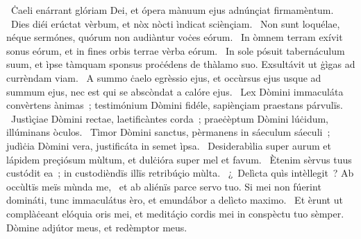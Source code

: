 \psalmChapterWithInscription{}
{ }
{%
~Ċaeli enárrant glóriam Dei, et ópera mànuum ejus adnúnçiat firmamèntum. 
~Dies diéi erúctat vèrbum, et nòx nòcti ìndicat sciènçiam. 
~Non sunt loquélae, néque sermónes, quórum non audiàntur voċes eórum. 
~In òmnem terram exívit sonus eórum, et in fines orbis terrae vèrba eórum. 
~In sole pósuit tabernáculum suum, et ìpse tàmquam sponsus proċédens de thàlamo suo. Exsultávit ut ġìgas ad currèndam viam. 
~A summo ċaelo egrèssio ejus, et occùrsus ejus usque ad summum ejus, nec est qui se abscòndat a calóre ejus. 
~Lex Dòmini immaculáta convèrtens ànimas~; testimónium Dòmini fidéle, sapiènçiam praestans párvulïs. 
~Justìçiae Dòmini rectae, laetificàntes corda~; praeċèptum Dòmini lúċidum, illúminans òculos. 
~Tìmor Dòmini sanctus, pèrmanens in sáeculum sáeculi~; judìċia Dòmini vera, justificáta in semet ìpsa. 
~Desiderabìlia super aurum et lápidem preçiósum mùltum, et dulċióra super mel et favum. 
~Ètenim sèrvus tuus custódit ea~; in custodièndïs illïs retribúçio mùlta. 
~¿~Delìcta quìs intèllegit~? Ab occùltïs meïs mùnda me, 
~et ab aliénïs parce servo tuo. Si mei non fúerint domináti, tunc immaculátus èro, et emundábor a delìcto maximo. 
~Et èrunt ut complàċeant elóquia oris mei, et meditáçio cordis mei in conspèctu tuo sèmper. Dòmine adjútor meus, et redèmptor meus. 
}

